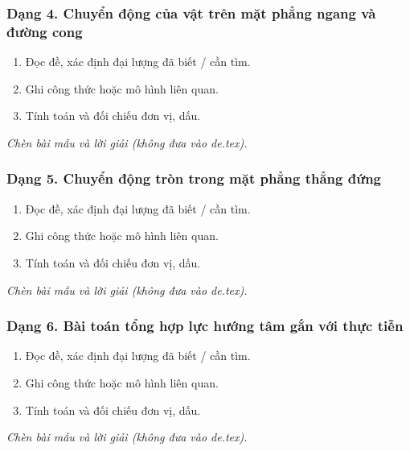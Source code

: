 \subsubsection{Dạng 4. Chuyển động của vật trên mặt phẳng ngang và đường cong}
\begin{phuongphap}
\begin{enumerate}
\item Đọc đề, xác định đại lượng đã biết / cần tìm.
\item Ghi công thức hoặc mô hình liên quan.
\item Tính toán và đối chiếu đơn vị, dấu.
\end{enumerate}
\end{phuongphap}
\begin{vidumau}
\textit{Chèn bài mẫu và lời giải (không đưa vào de.tex).}
\end{vidumau}

\subsubsection{Dạng 5. Chuyển động tròn trong mặt phẳng thẳng đứng}
\begin{phuongphap}
\begin{enumerate}
\item Đọc đề, xác định đại lượng đã biết / cần tìm.
\item Ghi công thức hoặc mô hình liên quan.
\item Tính toán và đối chiếu đơn vị, dấu.
\end{enumerate}
\end{phuongphap}
\begin{vidumau}
\textit{Chèn bài mẫu và lời giải (không đưa vào de.tex).}
\end{vidumau}

\subsubsection{Dạng 6. Bài toán tổng hợp lực hướng tâm gắn với thực tiễn}
\begin{phuongphap}
\begin{enumerate}
\item Đọc đề, xác định đại lượng đã biết / cần tìm.
\item Ghi công thức hoặc mô hình liên quan.
\item Tính toán và đối chiếu đơn vị, dấu.
\end{enumerate}
\end{phuongphap}
\begin{vidumau}
\textit{Chèn bài mẫu và lời giải (không đưa vào de.tex).}
\end{vidumau}

